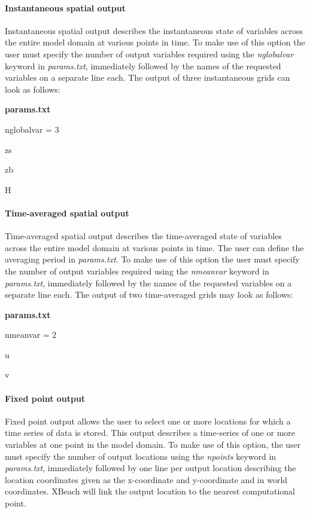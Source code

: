 \documentclass{article}
\begin{document}
\paragraph{ Instantaneous spatial output}

\noindent Instantaneous spatial output describes the instantaneous state of variables across the entire model domain at various points in time. To make use of this option the user must specify the number of output variables required using the \textit{nglobalvar} keyword in \textit{params.txt}, immediately followed by the names of the requested variables on a separate line each. The output of three instantaneous grids can look as follows:

\noindent \textbf{params.txt}

\noindent nglobalvar = 3

\noindent zs

\noindent zb

\noindent H


\paragraph{ Time-averaged spatial output}

\noindent Time-averaged spatial output describes the time-averaged state of variables across the entire model domain at various points in time. The user can define the averaging period in \textit{params.txt}. To make use of this option the user must specify the number of output variables required using the \textit{nmeanvar} keyword in \textit{params.txt}, immediately followed by the names of the requested variables on a separate line each. The output of two time-averaged grids may look as follows:

\noindent \textbf{params.txt}

\noindent nmeanvar = 2

\noindent u

\noindent v

\noindent \eject \textit{}


\paragraph{ Fixed point output}

\noindent Fixed point output allows the user to select one or more locations for which a time series of data is stored. This output describes a time-series of one or more variables at one point in the model domain. To make use of this option, the user must specify the number of output locations using the \textit{npoints} keyword in \textit{params.txt}, immediately followed by one line per output location describing the location coordinates given as the x-coordinate and y-coordinate and in world coordinates. XBeach will link the output location to the nearest computational point.
\end{document}
